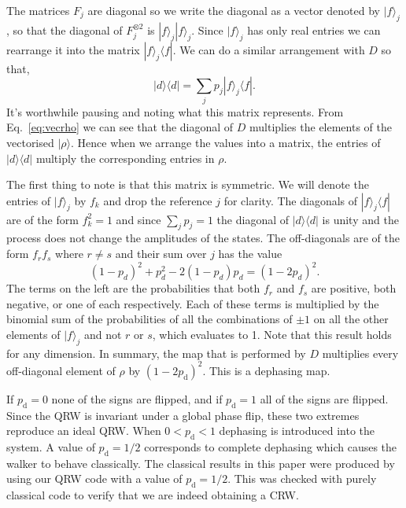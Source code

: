 \documentclass[aps,pra,twocolumn,amsmath,amssymb,nofootinbib,superscriptaddress]{revtex4}
\newcommand{\bra}[1]{\langle#1|}
\newcommand{\ket}[1]{|#1\rangle}
\begin{document}
The matrices $F_j$ are diagonal so we write the diagonal as a vector denoted by $\ket{f}_j$, so that the diagonal of $F_j^{\otimes 2}$ is $\ket{f}_j\ket{f}_j$. Since $\ket{f}_j$ has only real entries we can rearrange it into the matrix $\ket{f}_j\bra{f}$. We can do a similar arrangement with $D$ so that,
\begin{equation}
    \ket{d}\!\bra{d} =  \sum_j p_j \ket{f}_j\bra{f}.
\end{equation}
It's worthwhile pausing and noting what this matrix represents. From Eq.~\ref{eq:vecrho} we can see that the diagonal of $D$ multiplies the elements of the vectorised $\ket{\rho}$. Hence when we arrange the values into a matrix, the entries of $\ket{d}\!\bra{d}$ multiply the corresponding entries in $\rho$.

The first thing to note is that this matrix is symmetric. We will denote the entries of $\ket{f}_j$ by $f_k$ and drop the reference $j$ for clarity. The diagonals of $\ket{f}_j\bra{f}$ are of the form $f_k^2=1$ and since $\sum_j p_j = 1$ the diagonal of $\ket{d}\bra{d}$ is unity and the process does not change the amplitudes of the states. The off-diagonals are of the form $f_rf_s$ where $r\ne s$ and their sum over $j$ has the value
\begin{equation}
    (1-p_d)^2+p_d^2-2(1-p_d)p_d = (1-2p_d)^2.
\end{equation}
The terms on the left are the probabilities that both $f_r$ and $f_s$ are positive, both negative, or one of each respectively.
Each of these terms is multiplied by the binomial sum of the probabilities of all the combinations of $\pm 1$ on all the other elements of $\ket{f}_j$ and not $r$ or $s$, which evaluates to 1. Note that this result holds for any dimension. In summary, the map that is performed by $D$ multiplies every off-diagonal element of $\rho$ by $(1-2p_{\mathrm{d}})^2$. This is a dephasing map.

If $p_{\mathrm{d}}=0$ none of the signs are flipped, and if $p_{\mathrm{d}}=1$ all of the signs are flipped. Since the QRW is invariant under a global phase flip, these two extremes reproduce an ideal QRW. When $0<p_{\mathrm{d}} <1$ dephasing is introduced into the system. A value of $p_{\mathrm{d}}=1/2$ corresponds to complete dephasing which causes the walker to behave classically. The classical results in this paper were produced by using our QRW code with a value of $p_{\mathrm{d}}=1/2$. This was checked with purely classical code to verify that we are indeed obtaining a CRW. 
\end{document}
